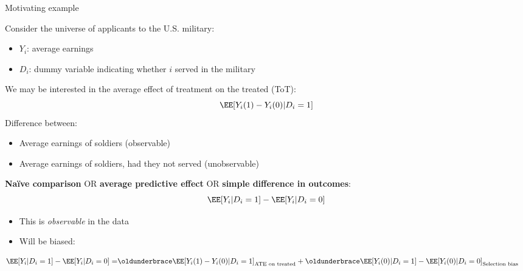 \documentclass[compress, 8pt]{beamer}
\begin{document}





\begin{frame}{Motivating example}

Consider the universe of applicants to the U.S. military:
\begin{itemize}
    \item $Y_i$: average earnings
    \item $D_i$: dummy variable indicating whether $i$ served in the military
\end{itemize}
We may be interested in the average effect of treatment on the treated (ToT):
\begin{equation*}
    \EE [Y_i(1) - Y_{i}(0) \vert D_i = 1]
\end{equation*}
Difference between:
\begin{itemize}
    \item Average earnings of soldiers (observable)
    \item Average earnings of soldiers, had they not served (unobservable)
\end{itemize}
\textbf{Na{\"i}ve comparison} OR \textbf{average predictive effect} OR \textbf{simple difference in outcomes}:
\begin{equation*}
    \EE [Y_i \vert D_i = 1] - \EE [Y_i \vert D_i=0] 
\end{equation*}
\begin{itemize}
\item This is \emph{observable} in the data
\item Will be biased:
\end{itemize}
\begin{align*}
\EE [Y_i \vert D_i = 1] - \EE [Y_i \vert D_i=0] 
=& \underbrace{\EE [Y_i(1) - Y_i(0) \vert D_i = 1]}_{\text{ATE on treated}} 
+ \underbrace{\EE [Y_i(0) \vert D_i = 1] - \EE [Y_i(0) \vert D_i=0]}_{\text{Selection bias}}
\end{align*}

\end{frame}
\end{document}
